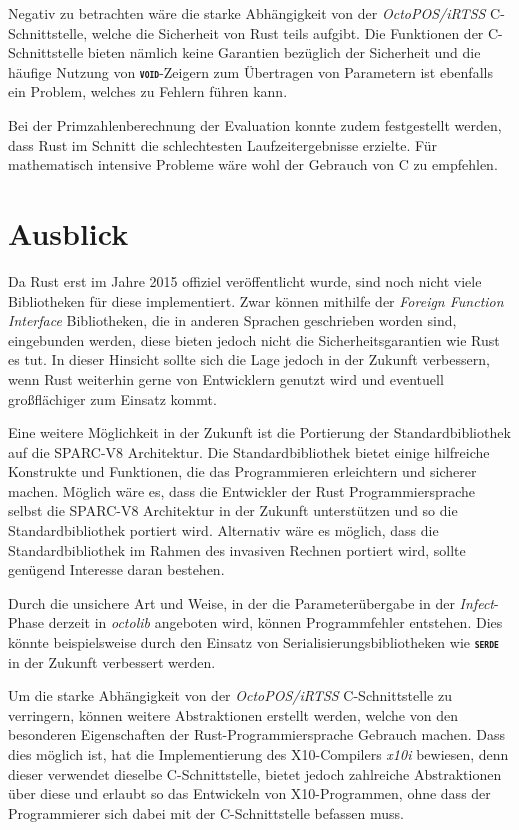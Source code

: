 Negativ zu betrachten wäre die starke Abhängigkeit von der \textit{OctoPOS/iRTSS} C-Schnittstelle,
welche die Sicherheit von Rust teils aufgibt. Die Funktionen der C-Schnittstelle bieten nämlich keine Garantien 
bezüglich der Sicherheit und die häufige Nutzung von \texttt{\textsc{\textbf{void}}}-Zeigern zum Übertragen
von Parametern ist ebenfalls ein Problem, welches zu Fehlern führen kann.

Bei der Primzahlenberechnung der Evaluation konnte zudem festgestellt werden, dass Rust im Schnitt die schlechtesten
Laufzeitergebnisse erzielte. Für mathematisch intensive Probleme wäre wohl der Gebrauch von C zu empfehlen.

\section{Ausblick}

Da Rust erst im Jahre 2015 offiziel veröffentlicht wurde, sind noch nicht viele Bibliotheken für diese implementiert.
Zwar können mithilfe der \textit{Foreign Function Interface} Bibliotheken,
die in anderen Sprachen geschrieben worden sind, eingebunden werden, diese bieten jedoch
nicht die Sicherheitsgarantien wie Rust es tut.
In dieser Hinsicht sollte sich die Lage jedoch in der Zukunft verbessern, wenn Rust
weiterhin gerne von Entwicklern genutzt wird und eventuell großflächiger zum Einsatz kommt.

Eine weitere Möglichkeit in der Zukunft ist die Portierung der Standardbibliothek auf die SPARC-V8 Architektur.
Die Standardbibliothek bietet einige hilfreiche Konstrukte und Funktionen,
die das Programmieren erleichtern und sicherer machen.
Möglich wäre es, dass die Entwickler der Rust Programmiersprache selbst die SPARC-V8 Architektur
in der Zukunft unterstützen und so die Standardbibliothek portiert wird. Alternativ wäre es möglich, dass die 
Standardbibliothek im Rahmen des invasiven Rechnen portiert wird, sollte genügend Interesse daran bestehen.

Durch die unsichere Art und Weise, in der die Parameterübergabe in der \textit{Infect}-Phase derzeit in
\textit{octolib} angeboten wird, können Programmfehler entstehen. Dies könnte beispielsweise durch den Einsatz von
Serialisierungsbibliotheken wie \texttt{\textsc{\textbf{serde}}} in der Zukunft verbessert werden.

Um die starke Abhängigkeit von der \textit{OctoPOS/iRTSS} C-Schnittstelle zu verringern,
können weitere Abstraktionen erstellt werden, welche von den
besonderen Eigenschaften der Rust-Programmiersprache Gebrauch machen.
Dass dies möglich ist, hat die Implementierung des X10-Compilers \textit{x10i} bewiesen,
denn dieser verwendet dieselbe C-Schnittstelle,
bietet jedoch zahlreiche Abstraktionen über diese und erlaubt so
das Entwickeln von X10-Programmen, ohne dass der Programmierer sich dabei mit der C-Schnittstelle befassen muss.
